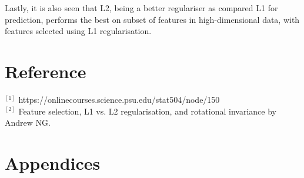 \documentclass[paper=a4,fontsize=12pt]{article}
\newcommand{\pythonscript}[3]{
\begin{small}

\end{small}
}
\begin{document}
Lastly, it is also seen that L2, being a better regulariser as compared L1 for prediction, performs the best on subset of features in high-dimensional data, with features selected using L1 regularisation.


\section{Reference}
$^{[1]}$ https://onlinecourses.science.psu.edu/stat504/node/150 \\
$^{[2]}$ Feature selection, L1 vs. L2 regularisation, and rotational invariance by Andrew NG.


\clearpage
\section{Appendices}
\pythonscript{LogisticRegression}{1}{151}
\end{document}
